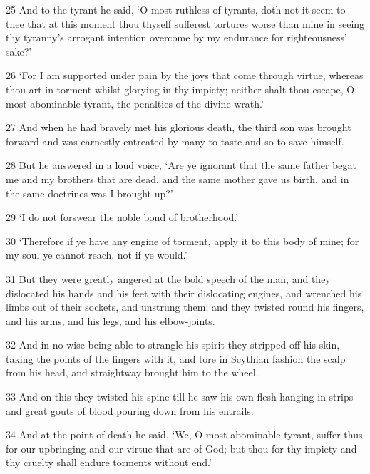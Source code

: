 \par 25 And to the tyrant he said, ‘O most ruthless of tyrants, doth not it seem to thee that at this moment thou thyself sufferest tortures worse than mine in seeing thy tyranny's arrogant intention overcome by my endurance for righteousness' sake?’

\par 26 ‘For I am supported under pain by the joys that come through virtue, whereas thou art in torment whilst glorying in thy impiety; neither shalt thou escape, O most abominable tyrant, the penalties of the divine wrath.’

\par 27 And when he had bravely met his glorious death, the third son was brought forward and was earnestly entreated by many to taste and so to save himself.

\par 28 But he answered in a loud voice, ‘Are ye ignorant that the same father begat me and my brothers that are dead, and the same mother gave us birth, and in the same doctrines was I brought up?’

\par 29 ‘I do not forswear the noble bond of brotherhood.’

\par 30 ‘Therefore if ye have any engine of torment, apply it to this body of mine; for my soul ye cannot reach, not if ye would.’

\par 31 But they were greatly angered at the bold speech of the man, and they dislocated his hands and his feet with their dislocating engines, and wrenched his limbs out of their sockets, and unstrung them; and they twisted round his fingers, and his arms, and his legs, and his elbow-joints.

\par 32 And in no wise being able to strangle his spirit they stripped off his skin, taking the points of the fingers with it, and tore in Scythian fashion the scalp from his head, and straightway brought him to the wheel.

\par 33 And on this they twisted his spine till he saw his own flesh hanging in strips and great gouts of blood pouring down from his entrails.

\par 34 And at the point of death he said, ‘We, O most abominable tyrant, suffer thus for our upbringing and our virtue that are of God; but thou for thy impiety and thy cruelty shall endure torments without end.’

